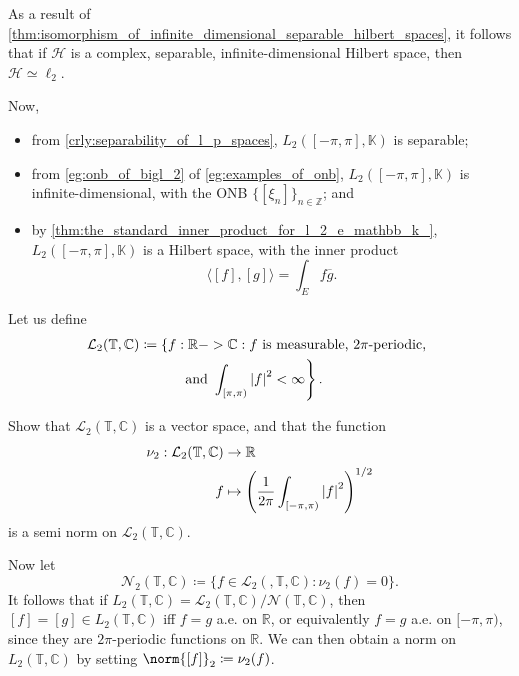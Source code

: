 \documentclass[notoc,notitlepage]{tufte-book}
\begin{document}
\begin{remark}
  As a result of
  \cref{thm:isomorphism_of_infinite_dimensional_separable_hilbert_spaces},
  it follows that
  if $\mathcal{H}$ is a complex, separable, infinite-dimensional Hilbert space,
  then $\mathcal{H} \simeq \ell_2$.

  Now,
  \begin{itemize}
    \item from \cref{crly:separability_of_l_p_spaces},
      $L_2([-\pi, \pi], \mathbb{K})$ is separable;
    \item from \cref{eg:onb_of_bigl_2} of \cref{eg:examples_of_onb},
      $L_2([-\pi, \pi], \mathbb{K})$ is infinite-dimensional,
      with the ONB $\{ [\xi_n] \}_{n \in \mathbb{Z}}$; and
    \item by \cref{thm:the_standard_inner_product_for_l_2_e_mathbb_k_},
      $L_2([-\pi, \pi], \mathbb{K})$ is a Hilbert space,
      with the inner product
      \begin{equation*}
        \langle [f], [g] \rangle = \int_{E} f \overline{g}.
      \end{equation*}
  \end{itemize}

  Let us define
  \begin{align*}
    \mathcal{L}_2(\mathbb{T}, \mathbb{C})
    &\coloneqq \left\{ f : \mathbb{R} -> \mathbb{C} :
      f \text{ is measurable, $2 \pi$-periodic, } \right. \\
    &\qquad\quad\left. \text{and }
      \int_{[\pi, \pi)} \left|f\right|^2 < \infty
    \right\}.
  \end{align*}
  \begin{ex}
    Show that $\mathcal{L}_2(\mathbb{T}, \mathbb{C})$ is
    a vector space, and that the function
    \begin{align*}
      \nu_2 : \mathcal{L}_2(\mathbb{T}, \mathbb{C}) &\to \mathbb{R} \\
      f & \mapsto \left( \frac{1}{2 \pi} \int_{[-\pi, \pi)} \left|f\right|^2 \right)^{1 / 2}
    \end{align*}
    is a semi norm on $\mathcal{L}_2(\mathbb{T}, \mathbb{C})$.
  \end{ex}

  Now let
  \begin{equation*}
    \mathcal{N}_2(\mathbb{T}, \mathbb{C}) \coloneqq
    \{ f \in \mathcal{L}_2(,\mathbb{T}, \mathbb{C}) : \nu_2(f) = 0 \}.
  \end{equation*}
  It follows that if
  $L_2(\mathbb{T}, \mathbb{C}) = \mathcal{L}_2(\mathbb{T}, \mathbb{C})
  / \mathcal{N}(\mathbb{T}, \mathbb{C})$,
  then $[f] = [g] \in L_2(\mathbb{T}, \mathbb{C})$ iff
  $f = g$ a.e. on $\mathbb{R}$,
  or equivalently $f = g$ a.e. on $[-\pi, \pi)$,
  since they are $2 \pi$-periodic functions on $\mathbb{R}$.
  We can then obtain a norm on $L_2(\mathbb{T}, \mathbb{C})$
  by setting $\norm{[f]}_2 \coloneqq \nu_2(f)$.
  

\end{remark}
\end{document}
